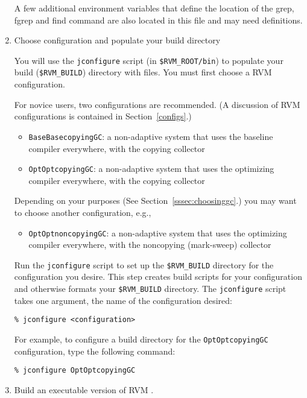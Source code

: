 \begin{enumerate}
A few additional environment variables that define the location of
the grep, fgrep and find command are also located in this file and
may need definitions.


\item Choose configuration and populate your build directory

You will use the {\tt jconfigure} script (in {\tt \$RVM\_ROOT/bin}) to
populate your build ({\tt \$RVM\_BUILD}) directory with files.  You must
first choose a RVM configuration.

For novice users, two configurations are recommended.  (A discussion
of RVM configurations is contained in Section~\ref{configs}.)

\begin{itemize}
\item {\tt BaseBasecopyingGC}: a non-adaptive system that uses the
baseline  compiler everywhere, with the copying collector
\item {\tt OptOptcopyingGC}: a non-adaptive system that uses the
optimizing compiler everywhere, with the copying collector
\end{itemize}

Depending on your purposes (See Section~\ref{sssec:choosinggc}.) you
may want to choose another configuration, e.g.,
\begin{itemize}
\item {\tt OptOptnoncopyingGC}: a non-adaptive system that uses the
optimizing  compiler everywhere, with the noncopying (mark-sweep) collector
\end{itemize}

Run the {\tt jconfigure} script to set up the {\tt \$RVM\_BUILD}
directory for the configuration you desire.  This step creates
build scripts for your configuration and otherwise formats your
{\tt \$RVM\_BUILD} directory.
The {\tt jconfigure} script takes one argument, the name of the
configuration desired: 

\begin{verbatim}
% jconfigure <configuration>
\end{verbatim}

For example, to configure a build 
directory for the {\tt OptOptcopyingGC} configuration, type
the following command:

\begin{verbatim}
% jconfigure OptOptcopyingGC
\end{verbatim}

\item Build an executable version of RVM .  


\end{enumerate}
